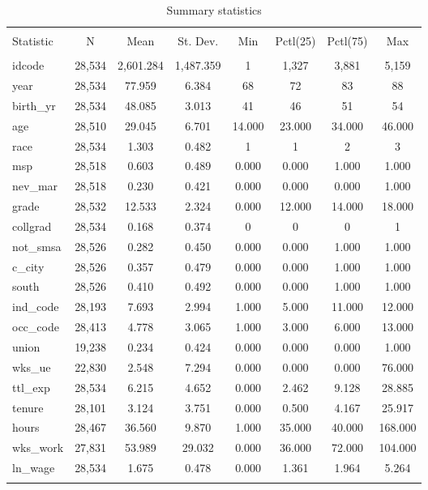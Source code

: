 \documentclass[
  12pt,
]{article}
\begin{document}
\begin{table}[ht] \centering 
  \caption{Summary statistics} 
  \label{tab1} 
\begin{tabular}{@{\extracolsep{5pt}}lccccccc} 
\\[-1.8ex]\hline 
\hline \\[-1.8ex] 
Statistic & \multicolumn{1}{c}{N} & \multicolumn{1}{c}{Mean} & \multicolumn{1}{c}{St. Dev.} & \multicolumn{1}{c}{Min} & \multicolumn{1}{c}{Pctl(25)} & \multicolumn{1}{c}{Pctl(75)} & \multicolumn{1}{c}{Max} \\ 
\hline \\[-1.8ex] 
idcode & 28,534 & 2,601.284 & 1,487.359 & 1 & 1,327 & 3,881 & 5,159 \\ 
year & 28,534 & 77.959 & 6.384 & 68 & 72 & 83 & 88 \\ 
birth\_yr & 28,534 & 48.085 & 3.013 & 41 & 46 & 51 & 54 \\ 
age & 28,510 & 29.045 & 6.701 & 14.000 & 23.000 & 34.000 & 46.000 \\ 
race & 28,534 & 1.303 & 0.482 & 1 & 1 & 2 & 3 \\ 
msp & 28,518 & 0.603 & 0.489 & 0.000 & 0.000 & 1.000 & 1.000 \\ 
nev\_mar & 28,518 & 0.230 & 0.421 & 0.000 & 0.000 & 0.000 & 1.000 \\ 
grade & 28,532 & 12.533 & 2.324 & 0.000 & 12.000 & 14.000 & 18.000 \\ 
collgrad & 28,534 & 0.168 & 0.374 & 0 & 0 & 0 & 1 \\ 
not\_smsa & 28,526 & 0.282 & 0.450 & 0.000 & 0.000 & 1.000 & 1.000 \\ 
c\_city & 28,526 & 0.357 & 0.479 & 0.000 & 0.000 & 1.000 & 1.000 \\ 
south & 28,526 & 0.410 & 0.492 & 0.000 & 0.000 & 1.000 & 1.000 \\ 
ind\_code & 28,193 & 7.693 & 2.994 & 1.000 & 5.000 & 11.000 & 12.000 \\ 
occ\_code & 28,413 & 4.778 & 3.065 & 1.000 & 3.000 & 6.000 & 13.000 \\ 
union & 19,238 & 0.234 & 0.424 & 0.000 & 0.000 & 0.000 & 1.000 \\ 
wks\_ue & 22,830 & 2.548 & 7.294 & 0.000 & 0.000 & 0.000 & 76.000 \\ 
ttl\_exp & 28,534 & 6.215 & 4.652 & 0.000 & 2.462 & 9.128 & 28.885 \\ 
tenure & 28,101 & 3.124 & 3.751 & 0.000 & 0.500 & 4.167 & 25.917 \\ 
hours & 28,467 & 36.560 & 9.870 & 1.000 & 35.000 & 40.000 & 168.000 \\ 
wks\_work & 27,831 & 53.989 & 29.032 & 0.000 & 36.000 & 72.000 & 104.000 \\ 
ln\_wage & 28,534 & 1.675 & 0.478 & 0.000 & 1.361 & 1.964 & 5.264 \\ 
\hline \\[-1.8ex] 
\end{tabular} 
\end{table}
\end{document}
